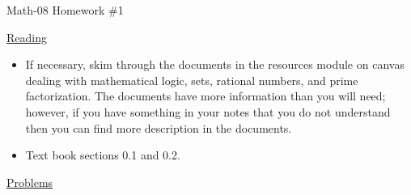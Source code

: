 \documentclass[letterpaper,12pt,fleqn]{article}
\begin{document}
\begin{center}
\Large Math-08 Homework \#1
\end{center}

\vspace{0.5in}

\underline{Reading}

\begin{itemize}
\item If necessary, skim through the documents in the resources module on
  canvas dealing with mathematical logic, sets, rational numbers, and prime
  factorization. The documents have more information than you will need;
  however, if you have something in your notes that you do not understand then
  you can find more description in the documents.
\item Text book sections 0.1 and 0.2.
\end{itemize}

\underline{Problems}
\end{document}
